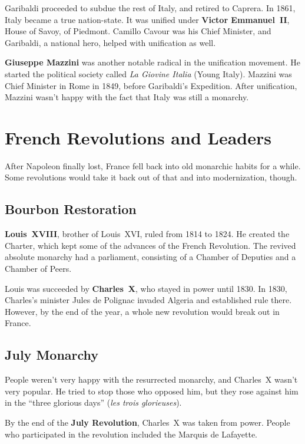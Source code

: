Garibaldi proceeded to subdue the rest of Italy, and retired to Caprera.
In 1861, Italy became a true nation-state.
It was unified under \textbf{Victor Emmanuel~II}, House of Savoy, of Piedmont.
Camillo Cavour was his Chief Minister, and Garibaldi, a national hero, helped with unification as well.

\textbf{Giuseppe Mazzini} was another notable radical in the unification movement.
He started the political society called \textit{La Giovine Italia} (Young Italy).
Mazzini was Chief Minister in Rome in 1849, before Garibaldi's Expedition.
After unification, Mazzini wasn't happy with the fact that Italy was still a monarchy.

\section{French Revolutions and Leaders}

After Napoleon finally lost, France fell back into old monarchic habits for a while.
Some revolutions would take it back out of that and into modernization, though.

\subsection*{Bourbon Restoration}

\textbf{Louis~XVIII}, brother of Louis~XVI, ruled from 1814 to 1824.
He created the Charter, which kept some of the advances of the French Revolution.
The revived absolute monarchy had a parliament, consisting of a Chamber of Deputies and a Chamber of Peers.

Louis was succeeded by \textbf{Charles~X}, who stayed in power until 1830.
In 1830, Charles's minister Jules de Polignac invaded Algeria and established rule there.
However, by the end of the year, a whole new revolution would break out in France.

\subsection*{July Monarchy}

People weren't very happy with the resurrected monarchy, and Charles~X wasn't very popular.
He tried to stop those who opposed him,
but they rose against him in the ``three glorious days'' (\textit{les trois glorieuses}).

By the end of the \textbf{July Revolution}, Charles~X was taken from power.
People who participated in the revolution included the Marquis de Lafayette.


